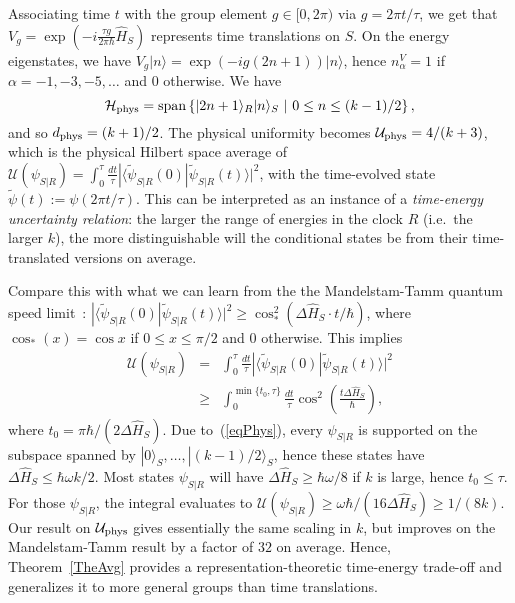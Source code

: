 \documentclass[aps,10pt,twocolumn,showpacs,pra,citeautoscript,amsmath,amssymb,floatfix,superscriptaddress]{revtex4-1}
\begin{document}
Associating time $t$ with the group element $g\in[0,2\pi)$ via $g=2\pi t/\tau$, we get that $V_g=\exp\left(-i\frac{\tau g}{2\pi\hbar}\hat H_S\right)$ represents time translations on $S$. On the energy eigenstates, we have $V_g|n\rangle=\exp(-ig(2n+1))|n\rangle$, hence $n_\alpha^V=1$ if $\alpha=-1,-3,-5,\ldots$ and $0$ otherwise. We have
\begin{equation}
   \mathcal{H}_{\rm phys}={\rm span}\left\{|2n+1\rangle_R|n\rangle_S\,\,|\,\, 0\leq n\leq(k-1)/2\right\},
   \label{eqPhys}
\end{equation}
and so $d_{\rm phys}=(k+1)/2$. The physical uniformity becomes $\mathcal{U}_{\rm phys}=4/(k+3)$, which is the physical Hilbert space average of $\mathcal{U}(\psi_{S|R})=\int_0^\tau \frac{dt}\tau |\langle \tilde\psi_{S|R}(0)|\tilde\psi_{S|R}(t)\rangle|^2$, with the time-evolved state $\tilde\psi(t):=\psi(2\pi t/\tau)$. This can be interpreted as an instance of a \emph{time-energy uncertainty relation}: the larger the range of energies in the clock $R$ (i.e.\ the larger $k$), the more distinguishable will the conditional states be from their time-translated versions on average.

Compare this with what we can learn from the the Mandelstam-Tamm quantum speed limit~\cite{MandelstamTamm,AnandanAharonov,Hoernedal,MarvianSpekkensZanardi}: $|\langle\tilde\psi_{S|R}(0)|\tilde\psi_{S|R}(t)\rangle|^2\geq \cos_*^2(\Delta \hat H_S\cdot t/\hbar)$, where $\cos_*(x)=\cos x$ if $0\leq x \leq \pi/2$ and $0$ otherwise. This implies
\begin{eqnarray*}
\mathcal{U}(\psi_{S|R})&=&\int_0^\tau \frac {dt}\tau |\langle\tilde\psi_{S|R}(0)|\tilde\psi_{S|R}(t)\rangle|^2\\
&\geq& \int_0^{\min\{t_0,\tau\}}\frac{dt}\tau\cos^2\left(\frac{t\Delta\hat H_S}\hbar\right),
\end{eqnarray*}
where $t_0=\pi\hbar/(2\Delta\hat H_S)$. Due to~(\ref{eqPhys}), every $\psi_{S|R}$ is supported on the subspace spanned by $|0\rangle_S,\ldots,|(k-1)/2\rangle_S$, hence these states have $\Delta\hat H_S\leq\hbar\omega k/2$. Most states $\psi_{S|R}$ will have $\Delta\hat H_S\geq \hbar\omega/8$ if $k$ is large, hence $t_0\leq\tau$. For those $\psi_{S|R}$, the integral evaluates to $\mathcal{U}(\psi_{S|R})\geq\omega\hbar/(16\Delta\hat H_S)\geq 1/(8k)$. Our result on $\mathcal{U}_{\rm phys}$ gives essentially the same scaling in $k$, but improves on the Mandelstam-Tamm result by a factor of $32$ on average. Hence, Theorem~\ref{TheAvg} provides a representation-theoretic time-energy trade-off and generalizes it to more general groups than time translations.
\end{document}

